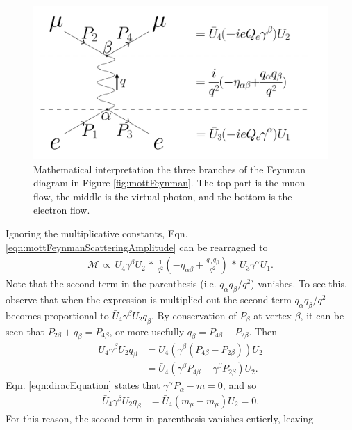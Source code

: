 \begin{figure}
  \centering
    \includegraphics[width=\textwidth]{Figures/MottFeynmanMath} 
  \caption[Mathematical interpretation the three branches of the Feynman diagram in Figure \ref{fig:mottFeynman}.]{Mathematical interpretation the three branches of the Feynman diagram in Figure \ref{fig:mottFeynman}. The top part is the muon flow, the middle is the virtual photon, and the bottom is the electron flow.}
  \label{fig:mottFeynmanMath}
\end{figure}
Ignoring the multiplicative constants, Eqn. \ref{eqn:mottFeynmanScatteringAmplitude} can be rearragned to
\begin{align*}
\mathcal{M} \, \propto \, \bar{U}_4\gamma^\beta U_2 \, * \, \frac{1}{q^2}(-\eta_{\alpha\beta}+\frac{q_\alpha q_\beta}{q^2}) \, *\, \bar{U}_3\gamma^\alpha U_1.
\end{align*}
Note that the second term in the parenthesis (i.e. $q_\alpha q_\beta / q^2$) vanishes. To see this, observe that when the expression is multiplied out the second term $q_\alpha q_\beta / q^2$ becomes proportional to $\bar{U}_4\gamma^\beta U_2 q_\beta$. By conservation of $P_\beta$ at vertex $\beta$, it can be seen that $P_{2\beta}+q_\beta=P_{4\beta}$, or more usefully $q_\beta=P_{4\beta}-P_{2\beta}$. Then
\begin{align*}
\bar{U}_4\gamma^\beta U_2 q_\beta&= \bar{U}_4(\gamma^\beta(P_{4\beta}-P_{2\beta})) U_2\\
&= \bar{U}_4(\gamma^\beta P_{4\beta}-\gamma^\beta P_{2\beta}) U_2 .
\end{align*}
Eqn. \ref{eqn:diracEquation} states that $\gamma^\alpha P_\alpha-m=0$, and so
\begin{align*}
\bar{U}_4\gamma^\beta U_2 q_\beta &= \bar{U}_4 (m_\mu-m_\mu) U_2=0.
\end{align*}
For this reason, the second term in parenthesis vanishes entierly, leaving
